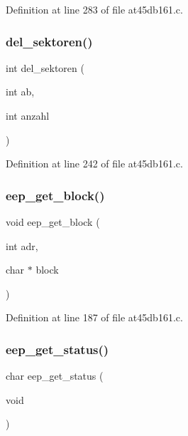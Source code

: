Definition at line 283 of file at45db161.\+c.

\mbox{\label{at45db161_8h_a8508bb974df22f655c2aa4222ebf9c44}} 
\subsubsection{del\+\_\+sektoren()}
{\footnotesize\ttfamily int del\+\_\+sektoren (\begin{DoxyParamCaption}\item[{int}]{ab,  }\item[{int}]{anzahl }\end{DoxyParamCaption})}



Definition at line 242 of file at45db161.\+c.

\mbox{\label{at45db161_8h_a3697d03798d6b7730b11e0e0112fc1e8}} 
\subsubsection{eep\+\_\+get\+\_\+block()}
{\footnotesize\ttfamily void eep\+\_\+get\+\_\+block (\begin{DoxyParamCaption}\item[{int}]{adr,  }\item[{char $\ast$}]{block }\end{DoxyParamCaption})}



Definition at line 187 of file at45db161.\+c.

\mbox{\label{at45db161_8h_a2f99543647ff9740dfcb82ff6349fb49}} 
\subsubsection{eep\+\_\+get\+\_\+status()}
{\footnotesize\ttfamily char eep\+\_\+get\+\_\+status (\begin{DoxyParamCaption}\item[{void}]{ }\end{DoxyParamCaption})}



